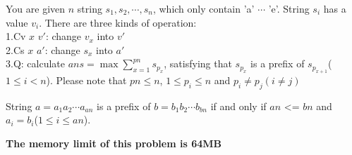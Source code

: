 You are given $n$ string $s_{1},s_{2}, \cdots , s_{n}$, which only contain 'a' $\cdots$ 'e'. String $s_{i}$ has a value $v_{i}$. There are three kinds of operation:\\
1.Cv $x$ $v'$: change $v_{x}$ into $v'$\\
2.Cs $x$ $a'$: change $s_{x}$ into $a'$\\
3.Q: calculate $ans = \max{\sum_{x=1}^{pn}s_{p_{x}}}$, satisfying that $s_{p_{x}}$ is a prefix of $s_{p_{x+1}}$($1 \leq i < n$).
Please note that $pn \leq n$, $1 \leq p_{i} \leq n$ and $p_{i} \neq p_{j}(i \neq j)$

String $a=a_{1}a_{2} \cdots a_{an}$ is a prefix of $b=b_{1}b_{2} \cdots b_{bn}$ if and only if $an$ <= $bn$ and $a_{i}=b_{i}$($1 \leq i \leq an$).

\textbf{The memory limit of this problem is 64MB}